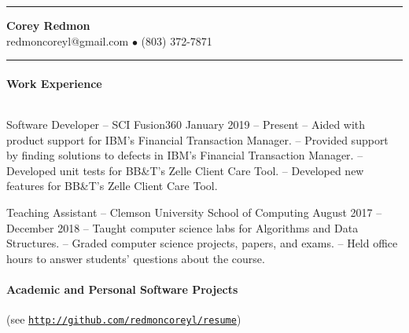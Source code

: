\documentclass{article}
\begin{document}
  \hrule height 1pt
  \vspace{0.05in}
  \begin{center}
    {\Large \textbf{Corey Redmon}}\\
    \vspace{0.1in}
    redmoncoreyl@gmail.com $\bullet$ (803) 372-7871
  \end{center}
  \vspace{0.1in}
  \hrule height 1pt

  \setlength{\parskip}{0.1in}
  \setlength{\parindent}{0.4in}

  \setlength{\parskip}{0.0in}
  \paragraph{Work Experience} $ $
  \setlength{\parskip}{0.1in}

  \hangindent=0.8in
  Software Developer -- SCI Fusion360 \hfill January 2019 -- Present \newline
  -- Aided with product support for IBM's Financial Transaction Manager. \newline
  -- Provided support by finding solutions to defects in IBM's Financial Transaction Manager. \newline
  -- Developed unit tests for BB\&T's Zelle Client Care Tool. \newline
  -- Developed new features for BB\&T's Zelle Client Care Tool.

  \hangindent=0.8in
  Teaching Assistant -- Clemson University School of Computing \hfill August 2017 -- December 2018 \newline
  -- Taught computer science labs for Algorithms and Data Structures. \newline
  -- Graded computer science projects, papers, and exams. \newline
  -- Held office hours to answer students' questions about the course.

  \setlength{\parskip}{0.0in}
  \paragraph{Academic and Personal Software Projects} \hfill (see \href{http://github.com/redmoncoreyl/resume}{\texttt{http://github.com/redmoncoreyl/resume}})%
  \setlength{\parskip}{0.1in}
\end{document}
